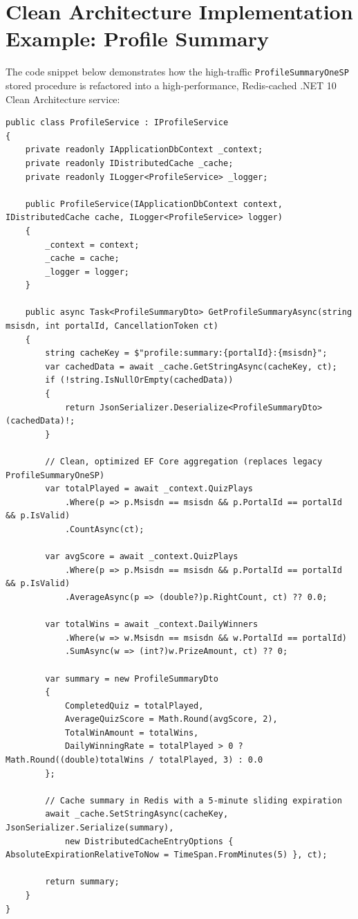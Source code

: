 \section{Clean Architecture Implementation Example: Profile Summary}
The code snippet below demonstrates how the high-traffic \texttt{ProfileSummaryOneSP} stored procedure is refactored into a high-performance, Redis-cached .NET 10 Clean Architecture service:

\begin{lstlisting}[language={[Sharp]C}, caption={Refactored ProfileService in .NET 10 Clean Architecture}]
public class ProfileService : IProfileService
{
    private readonly IApplicationDbContext _context;
    private readonly IDistributedCache _cache;
    private readonly ILogger<ProfileService> _logger;

    public ProfileService(IApplicationDbContext context, IDistributedCache cache, ILogger<ProfileService> logger)
    {
        _context = context;
        _cache = cache;
        _logger = logger;
    }

    public async Task<ProfileSummaryDto> GetProfileSummaryAsync(string msisdn, int portalId, CancellationToken ct)
    {
        string cacheKey = $"profile:summary:{portalId}:{msisdn}";
        var cachedData = await _cache.GetStringAsync(cacheKey, ct);
        if (!string.IsNullOrEmpty(cachedData))
        {
            return JsonSerializer.Deserialize<ProfileSummaryDto>(cachedData)!;
        }

        // Clean, optimized EF Core aggregation (replaces legacy ProfileSummaryOneSP)
        var totalPlayed = await _context.QuizPlays
            .Where(p => p.Msisdn == msisdn && p.PortalId == portalId && p.IsValid)
            .CountAsync(ct);

        var avgScore = await _context.QuizPlays
            .Where(p => p.Msisdn == msisdn && p.PortalId == portalId && p.IsValid)
            .AverageAsync(p => (double?)p.RightCount, ct) ?? 0.0;

        var totalWins = await _context.DailyWinners
            .Where(w => w.Msisdn == msisdn && w.PortalId == portalId)
            .SumAsync(w => (int?)w.PrizeAmount, ct) ?? 0;

        var summary = new ProfileSummaryDto
        {
            CompletedQuiz = totalPlayed,
            AverageQuizScore = Math.Round(avgScore, 2),
            TotalWinAmount = totalWins,
            DailyWinningRate = totalPlayed > 0 ? Math.Round((double)totalWins / totalPlayed, 3) : 0.0
        };

        // Cache summary in Redis with a 5-minute sliding expiration
        await _cache.SetStringAsync(cacheKey, JsonSerializer.Serialize(summary), 
            new DistributedCacheEntryOptions { AbsoluteExpirationRelativeToNow = TimeSpan.FromMinutes(5) }, ct);

        return summary;
    }
}
\end{lstlisting}

